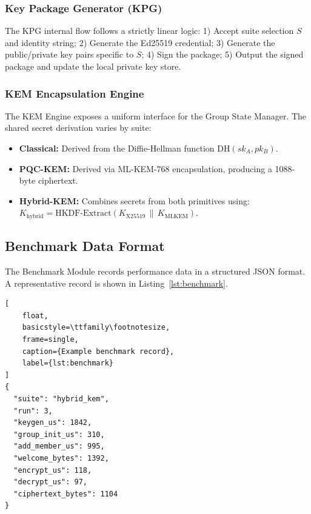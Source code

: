 \documentclass{ieeeaccess}
\begin{document}
\subsubsection{Key Package Generator (KPG)}
The KPG internal flow follows a strictly linear logic: 
1) Accept suite selection $S$ and identity string; 
2) Generate the Ed25519 credential; 
3) Generate the public/private key pairs specific to $S$; 
4) Sign the package; 
5) Output the signed package and update the local private key store.
\subsubsection{KEM Encapsulation Engine}
The KEM Engine exposes a uniform interface for the Group State Manager. The shared secret derivation varies by suite:
\begin{itemize}[style=nextline, leftmargin=1em]
    \item \textbf{Classical:} Derived from the Diffie-Hellman function $\text{DH}(sk_A, pk_B)$.
    \item \textbf{PQC-KEM:} Derived via ML-KEM-768 encapsulation, producing a 1088-byte ciphertext.
    \item \textbf{Hybrid-KEM:} Combines secrets from both primitives using:
    $K_{\text{hybrid}} = \text{HKDF-Extract}(K_{\text{X25519}} \,\|\, K_{\text{MLKEM}})$.
\end{itemize}
\subsection{Benchmark Data Format}
The Benchmark Module records performance data in a structured JSON format. A representative record is shown in Listing~\ref{lst:benchmark}.
\begin{lstlisting}[
    float,
    basicstyle=\ttfamily\footnotesize,
    frame=single,
    caption={Example benchmark record},
    label={lst:benchmark}
]
{
  "suite": "hybrid_kem",
  "run": 3,
  "keygen_us": 1842,
  "group_init_us": 310,
  "add_member_us": 995,
  "welcome_bytes": 1392,
  "encrypt_us": 118,
  "decrypt_us": 97,
  "ciphertext_bytes": 1104
}
\end{lstlisting}
\end{document}

